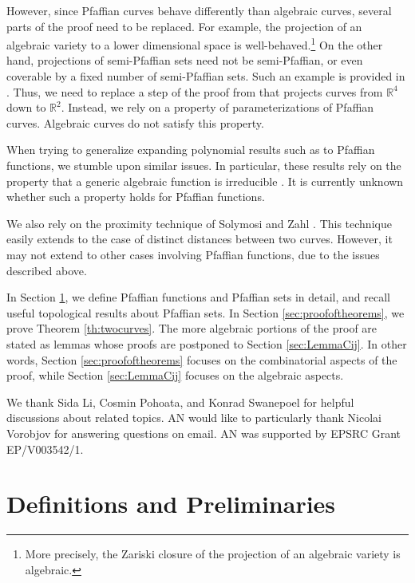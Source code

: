 \documentclass[11pt]{article}
\theoremstyle{definition}
\newcommand{\parag}[1]{\vspace{2mm}
\noindent{\bf #1} }
\newcommand{\RR}{\mathbb R}
\begin{document}
However, since Pfaffian curves behave differently than algebraic curves, several parts of the proof need to be replaced. 
For example, the projection of an algebraic variety to a lower dimensional space is well-behaved.\footnote{More precisely, the Zariski closure of the projection of an algebraic variety is algebraic.}
On the other hand, projections of semi-Pfaffian sets need not be semi-Pfaffian, or even coverable by a fixed number of semi-Pfaffian sets. Such an example is provided in \cite{Osgood16}.
Thus, we need to replace a step of the proof from \cite{PachDZ17} that projects curves from $\RR^4$ down to $\RR^2$.
Instead, we rely on a property of parameterizations of Pfaffian curves. 
Algebraic curves do not satisfy this property. 

When trying to generalize expanding polynomial results such as \cite{RSdZ16,RSS16} to Pfaffian functions, we stumble upon similar issues.
In particular, these results rely on the property that a generic algebraic function is irreducible \cite{Stein89}. 
It is currently unknown whether such a property holds for Pfaffian functions. 

We also rely on the proximity technique of Solymosi and Zahl \cite{SolyZahl24}. 
This technique easily extends to the case of distinct distances between two curves.
However, it may not extend to other cases involving Pfaffian functions, due to the issues described above.

\parag{The paper structure.}   
In Section \ref{sec:pfaffian}, we define Pfaffian functions and Pfaffian sets in detail, and recall useful topological results about Pfaffian sets. 
In Section \ref{sec:proofoftheorems}, we prove Theorem \ref{th:twocurves}. 
The more algebraic portions of the proof are stated as lemmas whose proofs are postponed to Section \ref{sec:LemmaCij}.
In other words, Section \ref{sec:proofoftheorems} focuses on the combinatorial aspects of the proof, while Section \ref{sec:LemmaCij} focuses on the algebraic aspects.

\parag{Acknowledgments.} We thank Sida Li, Cosmin Pohoata, and Konrad Swanepoel for helpful discussions about related topics. AN would like to particularly thank Nicolai Vorobjov for answering questions on email. AN was supported by EPSRC Grant EP/V003542/1.



\section{Definitions and Preliminaries} 
\label{sec:pfaffian}
\end{document}
